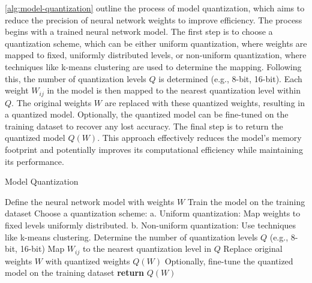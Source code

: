 \documentclass{ioereport}
\begin{document}
    
    \autoref{alg:model-quantization} outline the process of model quantization, which aims to reduce the precision of neural network weights to improve efficiency. The process begins with a trained neural network model. The first step is to choose a quantization scheme, which can be either uniform quantization, where weights are mapped to fixed, uniformly distributed levels, or non-uniform quantization, where techniques like k-means clustering are used to determine the mapping. Following this, the number of quantization levels $Q$ is determined (e.g., 8-bit, 16-bit). Each weight $W_{ij}$ in the model is then mapped to the nearest quantization level within $Q$. The original weights $W$ are replaced with these quantized weights, resulting in a quantized model. Optionally, the quantized model can be fine-tuned on the training dataset to recover any lost accuracy. The final step is to return the quantized model $Q(W)$. This approach effectively reduces the model's memory footprint and potentially improves its computational efficiency while maintaining its performance.
    
    \begin{algorithm}[H]
        \caption{Model Quantization}
        \label{alg:model-quantization}
        \begin{algorithmic}[1]
            \State Define the neural network model with weights $W$
            \State Train the model on the training dataset
            \State Choose a quantization scheme:
            \State \hspace{\algorithmicindent} a. Uniform quantization: Map weights to fixed levels uniformly distributed.
            \State \hspace{\algorithmicindent} b. Non-uniform quantization: Use techniques like k-means clustering.
            \State Determine the number of quantization levels $Q$ (e.g., 8-bit, 16-bit)
                \State Map $W_{ij}$ to the nearest quantization level in $Q$
            \EndFor
            \State Replace original weights $W$ with quantized weights $Q(W)$
            \State Optionally, fine-tune the quantized model on the training dataset
            \State \textbf{return} $Q(W)$
            \EndProcedure
        \end{algorithmic}
    \end{algorithm}
\end{document}
